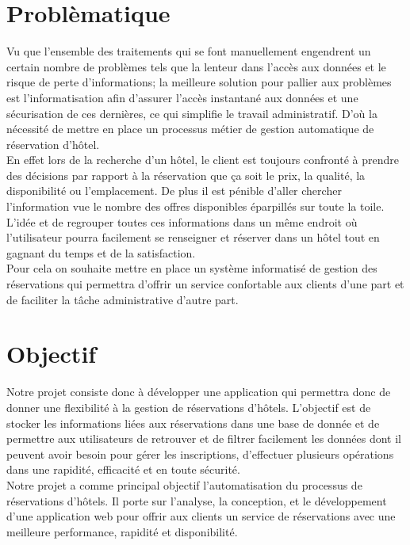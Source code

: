 \documentclass[12pt,a4paper]{report}
\begin{document}
		\section{Problèmatique}
Vu que l’ensemble des traitements qui se font manuellement engendrent un certain nombre de problèmes tels que la lenteur dans l'accès aux données et le risque de perte d’informations; la meilleure solution pour pallier aux problèmes est l'informatisation afin d'assurer l'accès instantané aux données et une sécurisation de ces dernières, ce qui simplifie le travail administratif. D’où la nécessité de mettre en place un processus métier de gestion automatique de réservation d'hôtel.\\
En effet lors de la recherche d'un hôtel, le client est toujours confronté à prendre des décisions par rapport à la réservation que ça soit le prix, la qualité, la disponibilité ou l'emplacement. De plus il est pénible d'aller chercher l'information vue le nombre des
offres disponibles éparpillés sur toute la toile. L’idée et de regrouper toutes ces informations dans un même endroit où l'utilisateur pourra facilement se renseigner et réserver dans un hôtel tout en gagnant du temps et de la satisfaction.\\
Pour cela on souhaite mettre en place un système informatisé de gestion des réservations qui permettra d’offrir un service confortable aux clients d’une part et de faciliter la tâche administrative d’autre part.

		
		\section{Objectif}
Notre projet consiste donc à développer une application qui permettra donc de donner
une flexibilité à la gestion de réservations d'hôtels. L’objectif est de stocker les informations
liées aux réservations dans une base de donnée et de permettre aux utilisateurs de retrouver et de
filtrer facilement les données dont il peuvent avoir besoin pour gérer les inscriptions, d’effectuer plusieurs
opérations dans une rapidité, efficacité et en toute sécurité.\\
Notre projet a comme principal objectif l’automatisation du processus de réservations d'hôtels. Il porte sur l’analyse, la conception, et le développement d’une application web pour offrir aux clients un service de réservations avec une meilleure performance, rapidité et disponibilité.
\end{document}
